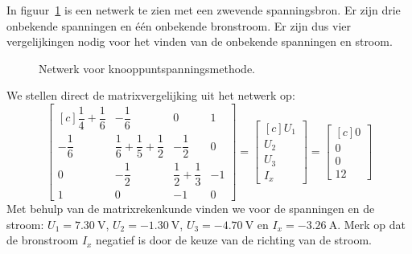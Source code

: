 \begin{example}
In figuur~\ref{fig:gelnetwerkvoornodalanalysis7} is een netwerk te zien met een zwevende spanningsbron. Er zijn drie onbekende spanningen en één onbekende bronstroom. Er zijn dus vier vergelijkingen nodig voor het vinden van de onbekende spanningen en stroom.

\begin{figure}[H]
\centering
{}
\caption{Netwerk voor knooppuntspanningsmethode.}
\label{fig:gelnetwerkvoornodalanalysis7}
\end{figure}

We stellen direct de matrixvergelijking uit het netwerk op:
%
\begin{equation}
\begin{bmatrix*}[c]
\dfrac{1}{4}+\dfrac{1}{6} & -\dfrac{1}{6}  & 0 & 1 \\[1em]
-\dfrac{1}{6} & \dfrac{1}{6}+\dfrac{1}{5}+\dfrac{1}{2} & -\dfrac{1}{2} & 0 \\[1em] 
0 & -\dfrac{1}{2} & \dfrac{1}{2}+\dfrac{1}{3} & -1 \\[1em]
1 & 0 & -1 & 0
\end{bmatrix*} =
\begin{bmatrix*}[c]
U_1 \\[1em] U_2\\[1em] U_3\\[1em] I_x
\end{bmatrix*} = 
\begin{bmatrix*}[c]
0 \\[1em] 0 \\[1em] 0 \\[1em] 12
\end{bmatrix*}
\end{equation}
%
Met behulp van de matrixrekenkunde vinden we voor de spanningen en de stroom: $U_1 = \SI{7.30}{\volt}$, $U_2 = \SI{-1.30}{\volt}$, $U_3 = \SI{-4.70}{\volt}$ en $I_x = \SI{-3.26}{\ampere}$. Merk op dat de bronstroom $I_x$ negatief is door de keuze van de richting van de stroom.
\end{example}

